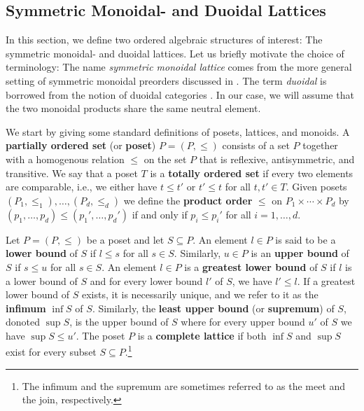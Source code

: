 \documentclass[a4paper,11pt]{article}
\theoremstyle{remark}
\begin{document}
\subsection{Symmetric Monoidal- and Duoidal Lattices}\label{sec:structures_and_bistructures}

In this section, we define two ordered algebraic structures of interest: The symmetric monoidal- and duoidal lattices. Let us briefly motivate the choice of terminology: The name \textit{symmetric monoidal lattice} comes from the more general setting of symmetric monoidal preorders discussed in \cite[Definition~2.2]{fong2018seven}. The term \textit{duoidal} is borrowed from the notion of duoidal categories \cite{nlab:duoidal_category}. In our case, we will assume that the two monoidal products share the same neutral element.

We start by giving some standard definitions of posets, lattices, and monoids. A \textbf{partially ordered set} (or \textbf{poset}) $P=(P,\leq)$ consists of a set $P$ together with a homogenous relation $\leq$ on the set $P$ that is reflexive, antisymmetric, and transitive. We say that a poset $T$ is a \textbf{totally ordered set} if every two elements are comparable, i.e., we either have $t\leq t'$ or $t'\leq t$ for all $t,t'\in T$. Given posets $(P_1,\leq_1),\dots,(P_d,\leq_d)$ we define the \textbf{product order} $\leq$ on $P_1\times\cdots\times P_d$ by $(p_1,\ldots,p_d)\leq (p_1',\ldots,p_d')$ if and only if $p_i\leq p_i'$ for all $i=1,\dots,d$.

Let $P=(P,\leq)$ be a poset and let $S\subseteq P$. An element $l\in P$ is said to be a \textbf{lower bound} of $S$ if $l\leq s$ for all $s\in S$. Similarly, $u\in P$ is an \textbf{upper bound} of $S$ if $s\leq u$ for all $s\in S$. An element $l\in P$ is a \textbf{greatest lower bound} of $S$ if $l$ is a lower bound of $S$ and for every lower bound $l'$ of $S$, we have $l'\leq l$. If a greatest lower bound of $S$ exists, it is necessarily unique, and we refer to it as the \textbf{infimum} $\inf S$ of $S$. Similarly, the \textbf{least upper bound} (or \textbf{supremum}) of $S$, donoted $\sup S$, is the upper bound of $S$ where for every upper bound $u'$ of $S$ we have $\sup S\leq u'$. The poset $P$ is a \textbf{complete lattice} if both $\inf S$ and $\sup S$ exist for every subset $S\subseteq P$.\footnote{The infimum and the supremum are sometimes referred to as the meet and the join, respectively.} 
\end{document}
